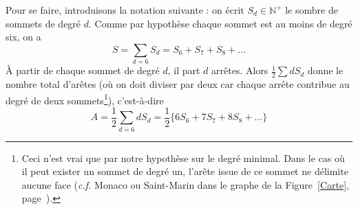 Pour se faire, introduisons la notation suivante :
on écrit $S_d\in\mathbb{N}^+$ le sombre de sommets de degré $d$. Comme par hypothèse chaque sommet est au moins de degré six, on a $$S=\sum\limits_{d=6}S_d=S_6+S_7+S_8+...$$ À partir de chaque sommet de degré $d$, il part $d$ arrêtes. Alors $\frac{1}{2}\sum dS_d$ donne le nombre total d'arêtes (où on doit diviser par deux car chaque arrête contribue au degré de deux sommets\footnote{Ceci n'est vrai que par notre hypothèse sur le degré minimal. Dans le cas où il peut exister un sommet de degré un, l'arête issue de ce sommet ne délimite aucune face (\textit{c.f.} Monaco ou Saint-Marin dans le graphe de la Figure~\ref{Carte}, page~\pageref{Carte}).}), c'est-à-dire $$A=\dfrac{1}{2}\sum\limits_{d=6}dS_d=\dfrac{1}{2}\Big\lbrace 6S_6+7S_7+8S_8+...\Big\rbrace$$
